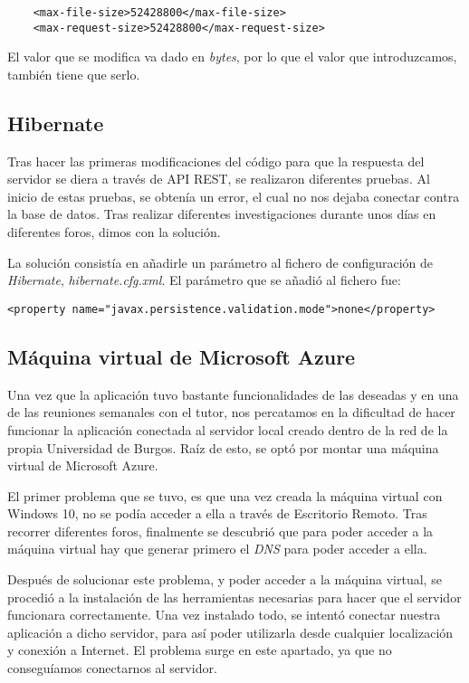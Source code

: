 \begin{lstlisting}
	<max-file-size>52428800</max-file-size>
	<max-request-size>52428800</max-request-size>
\end{lstlisting}

El valor que se modifica va dado en \textit{bytes}, por lo que el valor que introduzcamos, también tiene que serlo.

\subsection{Hibernate}

Tras hacer las primeras modificaciones del código para que la respuesta del servidor se diera a través de API REST, se realizaron diferentes pruebas. Al inicio de estas pruebas, se obtenía un error, el cual no nos dejaba conectar contra la base de datos. Tras realizar diferentes investigaciones durante unos días en diferentes foros, dimos con la solución.

La solución consistía en añadirle un parámetro al fichero de configuración de \textit{Hibernate}, \textit{hibernate.cfg.xml}. El parámetro que se añadió al fichero fue:

\begin{lstlisting}
<property name="javax.persistence.validation.mode">none</property>
\end{lstlisting}

\subsection{Máquina virtual de Microsoft Azure}\label{azure}

Una vez que la aplicación tuvo bastante funcionalidades de las deseadas y en una de las reuniones semanales con el tutor, nos percatamos en la dificultad de hacer funcionar la aplicación conectada al servidor local creado dentro de la red de la propia Universidad de Burgos. Raíz de esto, se optó por montar una máquina virtual de Microsoft Azure.

El primer problema que se tuvo, es que una vez creada la máquina virtual con Windows 10, no se podía acceder a ella a través de Escritorio Remoto. Tras recorrer diferentes foros, finalmente se descubrió que para poder acceder a la máquina virtual hay que generar primero el \textit{DNS} para poder acceder a ella.

Después de solucionar este problema, y poder acceder a la máquina virtual, se procedió a la instalación de las herramientas necesarias para hacer que el servidor funcionara correctamente. Una vez instalado todo, se intentó conectar nuestra aplicación a dicho servidor, para así poder utilizarla desde cualquier localización y conexión a Internet. El problema surge en este apartado, ya que no conseguíamos conectarnos al servidor.

